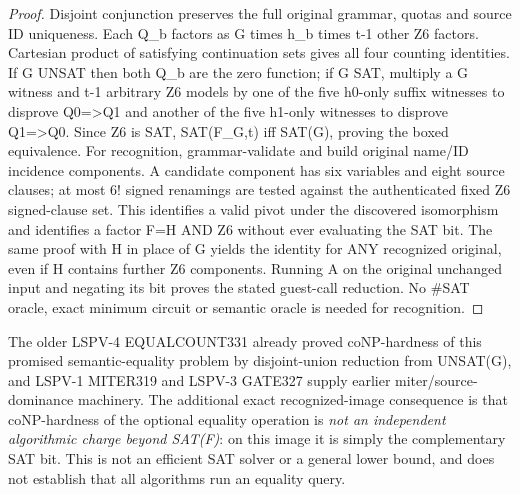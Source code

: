 \documentclass[11pt]{article}
\begin{document}
\begin{proof}
Disjoint conjunction preserves the full original grammar, quotas and source ID uniqueness. Each Q_b factors as G times h_b times t-1 other Z6 factors. Cartesian product of satisfying continuation sets gives all four counting identities. If G UNSAT then both Q_b are the zero function; if G SAT, multiply a G witness and t-1 arbitrary Z6 models by one of the five h0-only suffix witnesses to disprove Q0=>Q1 and another of the five h1-only witnesses to disprove Q1=>Q0. Since Z6 is SAT, SAT(F_{G,t}) iff SAT(G), proving the boxed equivalence. For recognition, grammar-validate and build original name/ID incidence components. A candidate component has six variables and eight source clauses; at most 6! signed renamings are tested against the authenticated fixed Z6 signed-clause set. This identifies a valid pivot under the discovered isomorphism and identifies a factor F=H AND Z6 without ever evaluating the SAT bit. The same proof with H in place of G yields the identity for ANY recognized original, even if H contains further Z6 components. Running A on the original unchanged input and negating its bit proves the stated guest-call reduction. No #SAT oracle, exact minimum circuit or semantic oracle is needed for recognition.
\end{proof}
\noindent The older LSPV-4 EQUALCOUNT331 already proved coNP-hardness of this promised semantic-equality problem by disjoint-union reduction from UNSAT(G), and LSPV-1 MITER319 and LSPV-3 GATE327 supply earlier miter/source-dominance machinery. The additional exact recognized-image consequence is that coNP-hardness of the optional equality operation is \emph{not an independent algorithmic charge beyond SAT(F)}: on this image it is simply the complementary SAT bit. This is not an efficient SAT solver or a general lower bound, and does not establish that all algorithms run an equality query.
\end{document}
